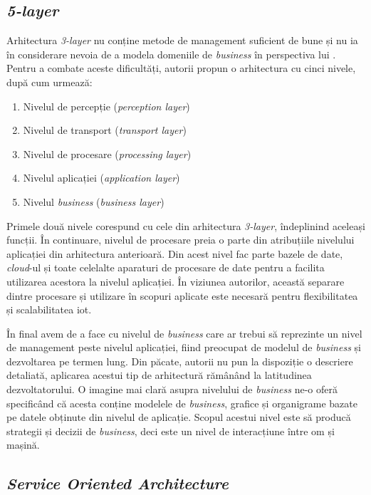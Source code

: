 \subsection*{\textit{5-layer}}

Arhitectura \textit{3-layer} nu conține metode de management suficient de bune și nu ia în considerare nevoia de a modela domeniile de \textit{business} în perspectiva lui \citet{MiaoWu2010}. Pentru a combate aceste dificultăți, autorii propun o arhitectura cu cinci nivele, după cum urmează:

\begin{enumerate}
    \item Nivelul de percepție (\textit{perception layer})
    \item Nivelul de transport (\textit{transport layer})
    \item Nivelul de procesare (\textit{processing layer})
    \item Nivelul aplicației (\textit{application layer})
    \item Nivelul \textit{business} (\textit{business layer})
\end{enumerate}

Primele două nivele corespund cu cele din arhitectura \textit{3-layer}, îndeplinind aceleași funcții. În continuare, nivelul de procesare preia o parte din atribuțiile nivelului aplicației din arhitectura anterioară. Din acest nivel fac parte bazele de date, \textit{cloud}-ul și toate celelalte aparaturi de procesare de date pentru a facilita utilizarea acestora la nivelul aplicației. În viziunea autorilor, această separare dintre procesare și utilizare în scopuri aplicate este necesară pentru flexibilitatea și scalabilitatea \acrshort{iot}.

În final avem de a face cu nivelul de \textit{business} care ar trebui să reprezinte un nivel de management peste nivelul aplicației, fiind preocupat de modelul de \textit{business} și dezvoltarea pe termen lung. Din păcate, autorii nu pun la dispoziție o descriere detaliată, aplicarea acestui tip de arhitectură rămânând la latitudinea dezvoltatorului. O imagine mai clară asupra nivelului de \textit{business} ne-o oferă \citet{Khan2012} specificând că acesta conține modelele de \textit{business}, grafice și organigrame bazate pe datele obținute din nivelul de aplicație. Scopul acestui nivel este să producă strategii și decizii de \textit{business}, deci este un nivel de interacțiune între om și mașină.

\subsection*{\textit{Service Oriented Architecture}}

